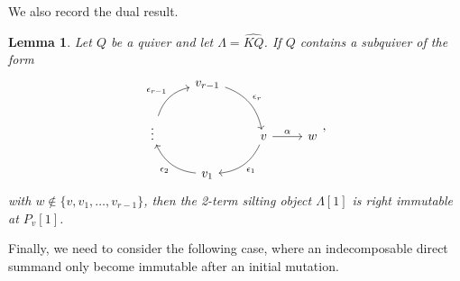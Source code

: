 \documentclass[11pt]{amsart}
\newtheorem{lemma}[theorem]{Lemma}
\theoremstyle{definition}
\begin{document}
We also record the dual result.


\begin{lemma}\label{lem:mutprobcycleout}
	Let $Q$ be a quiver and let $\Lambda = \widehat{KQ}$. If $Q$ contains a subquiver of the form 
	\[ \begin{tikzcd} 
	& v_{r-1} \arrow[rd, bend left, "\epsilon_r"] \\
	\vdots \arrow[ru, bend left, "\epsilon_{r-1}"] &&v \arrow[ld, bend left, "\epsilon_1"] \arrow[r, "\alpha"] & w \\
	&v_1 \arrow[lu, bend left, "\epsilon_2"]
	 \end{tikzcd}, \]
	with $w \not \in \{ v, v_1, \dots, v_{r-1}\}$, then the 2-term silting object $\Lambda[1]$ is right immutable at $P_v[1]$. 
\end{lemma}

Finally, we need to consider the following case, where an indecomposable direct summand only become immutable after an initial mutation.
\end{document}
